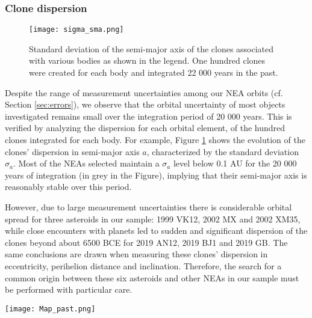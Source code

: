 \documentclass[letters,a4paper,fleqn,usenatbib]{mnras}
\begin{document}
\subsubsection{Clone dispersion}

\begin{figure}
    \centering
    \texttt{[image: sigma\_sma.png]}
    \caption{Standard deviation of the semi-major axis of the clones associated with various bodies as shown in the legend.  One hundred clones were created for each body and integrated 22 000 years in the past. }
    \label{fig:sigma_sma}
\end{figure}

Despite the range of measurement uncertainties among our NEA orbits (cf. Section \ref{sec:errors}), we observe that the orbital uncertainty of most objects investigated remains small over the integration period of 20 000 years. This is verified by analyzing the dispersion for each orbital element, of the hundred clones integrated for each body. For example, Figure \ref{fig:sigma_sma} shows the evolution of the clones' dispersion in semi-major axis $a$, characterized by the standard deviation $\sigma_a$. Most of the NEAs selected maintain a $\sigma_a$ level below 0.1 AU for the 20 000 years of integration (in grey in the Figure), implying that their semi-major axis is reasonably stable over this period.

However, due to large measurement uncertainties there is considerable orbital spread for three asteroids in our sample: 1999 VK12, 2002 MX and 2002 XM35, while close encounters with planets led to sudden and significant dispersion of the clones beyond about 6500 BCE for 2019 AN12, 2019 BJ1 and 2019 GB. The same conclusions are drawn when measuring these clones' dispersion in eccentricity, perihelion distance and inclination. Therefore, the search for a common origin between these six asteroids and other NEAs in our sample must be performed with particular care. 

\begin{figure*}
    \centering
    \texttt{[image: Map\_past.png]}
    \caption{Possible rapprochements (close-approaches) between osculating orbits of TC candidates over the period 20 000 BC to 2000 CE. Labels on the abscissa and ordinate indicate the bodies integrated. Circles at position (body \#1, body \#2) indicate the percentage of clones of body \#1 approaching at least one clone of body \#2 with a MOID smaller than 0.05 AU and a relative velocity below 1 km/s. The size of the circle is proportional to the maximum percentage of clones retained for body \#1 (in abscissa) compared to body \#2 (in ordinate) over the integration period. The colour of the circle indicates the epoch when this highest percentage of clones retained is attained. The colour range has been restricted to the period 15 000 BCE to 2000 CE for clarity. Coordinates with no rapprochements are still given a small black dot to help guide the eye in reading the figure.}
    \label{fig:map_past}
\end{figure*}
\end{document}
